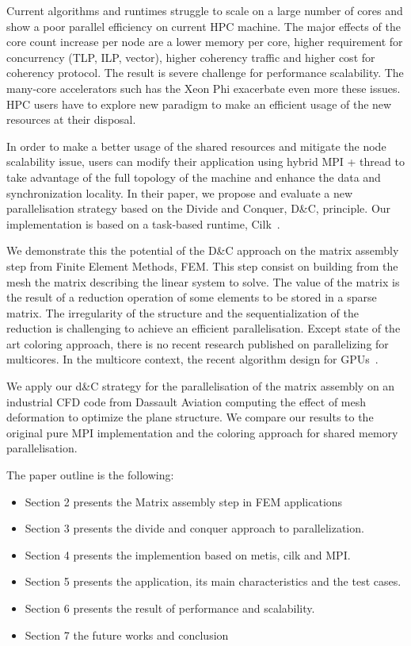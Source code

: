 \documentclass{IOS-Book-Article}
\begin{document}
Current algorithms and runtimes struggle to scale on a large number of cores and show a poor parallel efficiency on current HPC machine. 
The major effects of the core count increase per node are a lower memory per core, higher requirement for concurrency (TLP, ILP, vector), higher coherency traffic and higher cost for coherency protocol. The result is severe challenge for performance scalability. The many-core accelerators such has the Xeon Phi exacerbate even more these issues. HPC users have to explore new paradigm to make an efficient usage of the new resources at their disposal. 

In order to make a better usage of the shared resources and mitigate the node scalability issue, users can modify their application using hybrid MPI + thread to take advantage of the full topology of the machine and enhance the data and synchronization locality.
In their paper, we propose and evaluate a new parallelisation strategy based on the Divide and Conquer, D\&C, principle. Our implementation is based on a task-based runtime, Cilk~\cite{cilk5}. 

We demonstrate this the potential of the D\&C approach on the matrix assembly step from Finite Element Methods, FEM. This step consist on building from the mesh the matrix describing the linear system to solve. The value of the matrix is the result of a reduction operation of some elements to be stored in a sparse matrix. The irregularity of the structure and the sequentialization of the reduction is challenging to achieve an efficient parallelisation. Except state of the art coloring approach, there is no recent research published on parallelizing for multicores. In the multicore context, the recent algorithm design for GPUs~\cite{Stanford,CPUGPUasm}.

We apply our d\&C strategy for the parallelisation of the matrix assembly on an industrial CFD code from Dassault Aviation computing the effect of mesh deformation to optimize the plane structure. We compare our results to the original pure MPI implementation and the coloring approach for shared memory parallelisation.


The paper outline is the following:
\begin{itemize}
\item Section 2 presents the Matrix assembly step in FEM applications
\item Section 3 presents the divide and conquer approach to parallelization. 
\item Section 4 presents the implemention based on metis, cilk and MPI.
\item Section 5 presents the application, its main characteristics and the test cases.
\item Section 6 presents the result of performance and scalability. 
\item Section 7 the future works and conclusion
\end{itemize}
\end{document}
